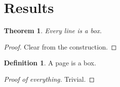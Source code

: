 \documentclass{article}
\begin{document}
\newtheorem{theorem}{Theorem}
\theoremstyle{definition}
\newtheorem{definition}{Definition}
\section{Results}
\begin{theorem}
Every line is a box.
\end{theorem}
\begin{proof}
Clear from the construction.
\end{proof}
\begin{definition}
A page is a box.
\end{definition}
\begin{proof}[Proof of everything]
Trivial.
\end{proof}
\end{document}
